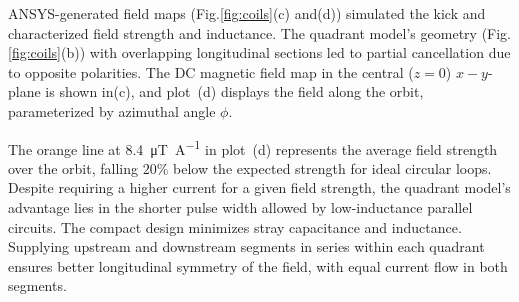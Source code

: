 \begin{refsection}
        ANSYS-generated field maps (Fig.\ref{fig:coils}(c) and(d)) simulated the kick and characterized field strength and inductance. The quadrant model's geometry (Fig.\ref{fig:coils}(b)) with overlapping longitudinal sections led to partial cancellation due to opposite polarities. The DC magnetic field map in the central ($z=0$) $x-y$-plane is shown in(c), and plot~(d) displays the field along the orbit, parameterized by azimuthal angle $\phi$.
        
        The orange line at \SI{8.4}{\micro\tesla\per\ampere} in plot~(d) represents the average field strength over the orbit, falling $20\%$ below the expected strength for ideal circular loops. 
        Despite requiring a higher current for a given field strength, the quadrant model's advantage lies in the shorter pulse width allowed by low-inductance parallel circuits. 
        The compact design minimizes stray capacitance and inductance. 
        Supplying upstream and downstream segments in series within each quadrant ensures better longitudinal symmetry of the field, with equal current flow in both segments.
        

\end{refsection}
